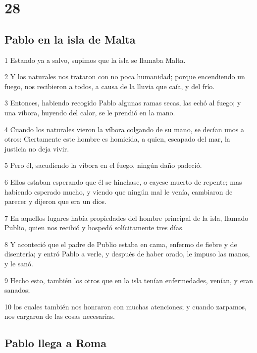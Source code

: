 \chapter{28}

\section*{Pablo en la isla de Malta}

\par 1 Estando ya a salvo, supimos que la isla se llamaba Malta.
\par 2 Y los naturales nos trataron con no poca humanidad; porque encendiendo un fuego, nos recibieron a todos, a causa de la lluvia que caía, y del frío.
\par 3 Entonces, habiendo recogido Pablo algunas ramas secas, las echó al fuego; y una víbora, huyendo del calor, se le prendió en la mano.
\par 4 Cuando los naturales vieron la víbora colgando de su mano, se decían unos a otros: Ciertamente este hombre es homicida, a quien, escapado del mar, la justicia no deja vivir.
\par 5 Pero él, sacudiendo la víbora en el fuego, ningún daño padeció.
\par 6 Ellos estaban esperando que él se hinchase, o cayese muerto de repente; mas habiendo esperado mucho, y viendo que ningún mal le venía, cambiaron de parecer y dijeron que era un dios.
\par 7 En aquellos lugares había propiedades del hombre principal de la isla, llamado Publio, quien nos recibió y hospedó solícitamente tres días.
\par 8 Y aconteció que el padre de Publio estaba en cama, enfermo de fiebre y de disentería; y entró Pablo a verle, y después de haber orado, le impuso las manos, y le sanó.
\par 9 Hecho esto, también los otros que en la isla tenían enfermedades, venían, y eran sanados;
\par 10 los cuales también nos honraron con muchas atenciones; y cuando zarpamos, nos cargaron de las cosas necesarias.

\section*{Pablo llega a Roma}

